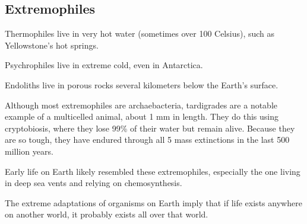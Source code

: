 \documentclass[class=article, crop=false]{standalone}
\begin{document}
\subsection{Extremophiles}
Thermophiles live in very hot water (sometimes over 100 Celsius), such as Yellowstone's hot springs.
\par
Psychrophiles live in extreme cold, even in Antarctica.
\par
Endoliths live in porous rocks several kilometers below the Earth's surface.
\par
Although most extremophiles are archaebacteria, tardigrades are a notable example of a multicelled animal, about 1 mm in length. They do this using cryptobiosis, where they lose 99\% of their water but remain alive. Because they are so tough, they have endured through all 5 mass extinctions in the last 500 million years.
\par
Early life on Earth likely resembled these extremophiles, especially the one living in deep sea vents and relying on chemosynthesis.
\par
The extreme adaptations of organisms on Earth imply that if life exists anywhere on another world, it probably exists all over that world.
\end{document}
